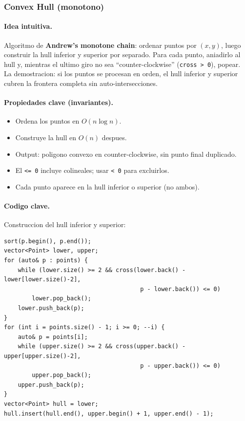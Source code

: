 ﻿\subsubsection{Convex Hull (monotono)}

\paragraph{Idea intuitiva.}
Algoritmo de \textbf{Andrew's monotone chain}: ordenar puntos por $(x, y)$, luego construir la hull inferior y superior por separado. Para cada punto, aniadirlo al hull y, mientras el ultimo giro no sea ``counter-clockwise'' (\texttt{cross > 0}), popear. La demostracion: si los puntos se procesan en orden, el hull inferior y superior cubren la frontera completa sin auto-intersecciones.

\paragraph{Propiedades clave (invariantes).}
\begin{itemize}\setlength\itemsep{0pt}
	\item Ordena los puntos en $O(n \log n)$.
	\item Construye la hull en $O(n)$ despues.
	\item Output: poligono convexo en counter-clockwise, sin punto final duplicado.
	\item El \texttt{<= 0} incluye colineales; usar \texttt{< 0} para excluirlos.
	\item Cada punto aparece en la hull inferior o superior (no ambos).
\end{itemize}

\paragraph{Codigo clave.}
Construccion del hull inferior y superior:
\begin{verbatim}
sort(p.begin(), p.end());
vector<Point> lower, upper;
for (auto& p : points) {
    while (lower.size() >= 2 && cross(lower.back() - lower[lower.size()-2],
                                       p - lower.back()) <= 0)
        lower.pop_back();
    lower.push_back(p);
}
for (int i = points.size() - 1; i >= 0; --i) {
    auto& p = points[i];
    while (upper.size() >= 2 && cross(upper.back() - upper[upper.size()-2],
                                       p - upper.back()) <= 0)
        upper.pop_back();
    upper.push_back(p);
}
vector<Point> hull = lower;
hull.insert(hull.end(), upper.begin() + 1, upper.end() - 1);
\end{verbatim}

